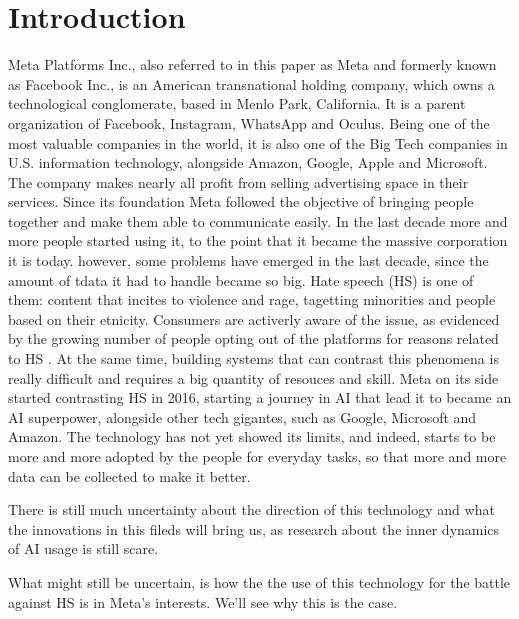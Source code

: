 \section{Introduction}

Meta Platforms Inc., also referred to in this paper as Meta and
formerly known as Facebook Inc., is an American transnational holding
company, which owns a technological conglomerate, based in Menlo Park,
California. It is a parent organization of Facebook, Instagram,
WhatsApp and Oculus. Being one of the most valuable companies in the
world, it is also one of the Big Tech companies in U.S. information
technology, alongside Amazon, Google, Apple and Microsoft. The company
makes nearly all profit from selling advertising space in their
services. Since its foundation Meta followed the objective of bringing
people together and make them able to communicate easily. In the last
decade more and more people started using it, to the point that it
became the massive corporation it is today. however, some problems
have emerged in the last decade, since the amount of tdata it had to
handle became so big. Hate speech (HS) is one of them: content that
incites to violence and rage, tagetting minorities and people based on
their etnicity. Consumers are activerly aware of the issue, as
evidenced by the growing number of people opting out of the platforms
for reasons related to HS \cite{art:fortuna2018survey}. At the same
time, building systems that can contrast this phenomena is really
difficult and requires a big quantity of resouces and skill. Meta on
its side started contrasting HS in 2016, starting a journey in AI that
lead it to became an AI superpower, alongside other tech gigantes,
such as Google, Microsoft and Amazon. The technology has not yet
showed its limits, and indeed, starts to be more and more adopted by
the people for everyday tasks, so that more and more data can be
collected to make it better.

There is still much uncertainty about the direction of this technology
and what the innovations in this fileds will bring us, as research
about the inner dynamics of AI usage is still scare.

What might still be uncertain, is how the the use of this technology
for the battle against HS is in Meta's interests. We'll see why this
is the case.
